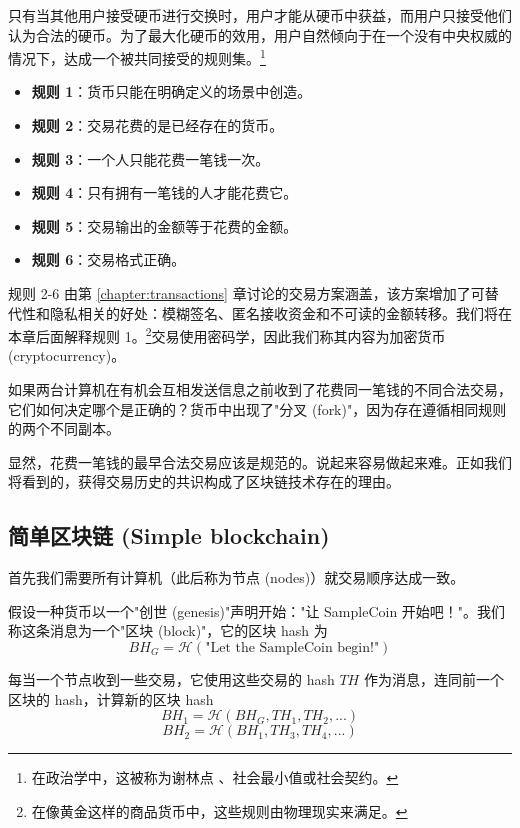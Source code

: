 只有当其他用户接受硬币进行交换时，用户才能从硬币中获益，而用户只接受他们认为合法的硬币。为了最大化硬币的效用，用户自然倾向于在一个没有中央权威的情况下，达成一个被共同接受的规则集。\footnote{在政治学中，这被称为谢林点 \cite{friedman-schelling}、社会最小值或社会契约。}
\begin{itemize}
    \item[] \textbf{规则 1}：货币只能在明确定义的场景中创造。
    \item[] \textbf{规则 2}：交易花费的是已经存在的货币。
    \item[] \textbf{规则 3}：一个人只能花费一笔钱一次。
    \item[] \textbf{规则 4}：只有拥有一笔钱的人才能花费它。
    \item[] \textbf{规则 5}：交易输出的金额等于花费的金额。
    \item[] \textbf{规则 6}：交易格式正确。
\end{itemize}

规则 2-6 由第 \ref{chapter:transactions} 章讨论的交易方案涵盖，该方案增加了可替代性和隐私相关的好处：模糊签名、匿名接收资金和不可读的金额转移。我们将在本章后面解释规则 1。\footnote{在像黄金这样的商品货币中，这些规则由物理现实来满足。}交易使用密码学，因此我们称其内容为{加密货币 (cryptocurrency)}。

如果两台计算机在有机会互相发送信息之前收到了花费同一笔钱的不同合法交易，它们如何决定哪个是正确的？货币中出现了"分叉 (fork)"，因为存在遵循相同规则的两个不同副本。

显然，花费一笔钱的最早合法交易应该是规范的。说起来容易做起来难。正如我们将看到的，获得交易历史的共识构成了区块链技术存在的理由。


\subsection{简单区块链 (Simple blockchain)}
\label{subsec:simple-blockchain}

首先我们需要所有计算机（此后称为{节点 (nodes)}）就交易顺序达成一致。

假设一种货币以一个"创世 (genesis)"声明开始："让 SampleCoin 开始吧！"。我们称这条消息为一个"区块 (block)"，它的区块 hash 为\vspace{.175cm}
\[\mathit{BH}_G = \mathcal{H}(\textrm{"Let the SampleCoin begin!"})\]

每当一个节点收到一些交易，它使用这些交易的 hash $\mathit{TH}$ 作为消息，连同前一个区块的 hash，计算新的区块 hash\vspace{.175cm}
\[\mathit{BH}_1 = \mathcal{H}(\mathit{BH}_G, \mathit{TH}_1, \mathit{TH}_2,...)\]
\[\mathit{BH}_2 = \mathcal{H}(\mathit{BH}_1, \mathit{TH}_3, \mathit{TH}_4,...)\]

